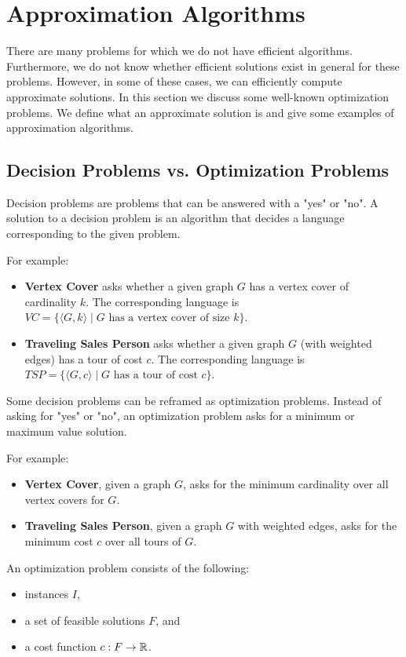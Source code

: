 \chapter{Approximation Algorithms}\label{C-approx}

There are many problems for which we do not have efficient algorithms.
Furthermore, we do not know whether efficient solutions exist in general for these problems.
However, in some of these cases, we can efficiently compute approximate solutions.
In this section we discuss some well-known optimization problems.
We define what an approximate solution is and give some examples of approximation algorithms.

\section{Decision Problems vs. Optimization Problems}

Decision problems are problems that can be answered with a "yes" or "no".
A solution to a decision problem is an algorithm that decides a language corresponding to the given problem.

For example:
\begin{itemize}
\item \textbf{Vertex Cover} asks whether a given graph $G$ has a vertex cover of cardinality $k$.
The corresponding language is $VC = \{\langle G, k\rangle \mid G \text{ has a vertex cover of size }k\}$.
\item \textbf{Traveling Sales Person} asks whether a given graph $G$ (with weighted edges) has a tour of cost $c$.
The corresponding language is $TSP = \{\langle G, c\rangle \mid G \text{ has a tour of cost }c\}$.
\end{itemize}

Some decision problems can be reframed as optimization problems.
Instead of asking for "yes" or "no", an optimization problem asks for a minimum or maximum value solution.

For example:
\begin{itemize}
\item \textbf{Vertex Cover}, given a graph $G$, asks for the minimum cardinality over all vertex covers for $G$.
\item \textbf{Traveling Sales Person}, given a graph $G$ with weighted edges, asks for the minimum cost $c$ over all tours of $G$.
\end{itemize}

An optimization problem consists of the following:
\begin{itemize}
\item instances $I$,
\item a set of feasible solutions $F$, and
\item a cost function $c: F \to {\mathbb R}$.
\end{itemize}

